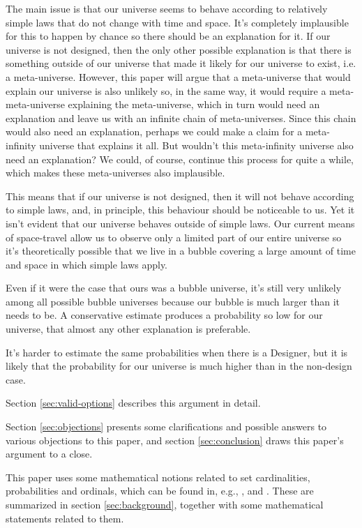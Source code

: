 \documentclass[a4paper
,draft
]{article}
\newcommand{\paper}[1]{paper}
\begin{document}
The main issue is that our universe seems to behave according to relatively
simple laws that do not change with time and space.
It’s completely implausible for this to happen by chance so there should be
an explanation for it.
If our universe is not designed, then the only other possible explanation is that
there is something outside of our universe that made it likely for our universe
to exist, i.e. a meta-universe.
However, this paper will argue that a meta-universe that
would explain our universe is also unlikely so, in the same way,
it would require a meta-meta-universe explaining the meta-universe,
which in turn would need an explanation and leave us with an infinite chain
of meta-universes.
Since this chain would also need an explanation, perhaps we could make a
claim for a meta-infinity universe that explains it all.
But wouldn't this meta-infinity universe also need an explanation?
We could, of course,
continue this process for quite a while,
which makes these meta-universes also implausible.

This means that if our universe is not designed, then it will not behave
according to simple laws, and, in principle, this behaviour should be
noticeable to us.
Yet it isn't evident that our universe behaves outside of simple laws.
Our current means of space-travel allow us to observe only a limited
part of our entire universe so it’s theoretically possible that we live
in a bubble covering
a large amount of time and space in which simple laws apply.

Even if it were the case that ours was a bubble universe,
it’s still very unlikely among all possible bubble universes
because our bubble is much larger than it needs to be.
A conservative estimate produces a probability so low for our universe,
that almost any other explanation is preferable.

It's harder to estimate the same probabilities when there is a Designer, but
it is likely that the probability for our universe is much higher than in the
non-design case.

Section \ref{sec:valid-options} describes this argument in detail.

Section \ref{sec:objections} presents some clarifications and possible
answers to various objections to this paper,
and section \ref{sec:conclusion} draws this \paper{}'s argument to a close.

This \paper{} uses some mathematical notions related to set cardinalities,
probabilities and ordinals, which can be found in, e.g.,
\textcite{sep-set-theory}, \textcite{Cohen1966} and \textcite{Billingsley1995}.
These are summarized in section \ref{sec:background}, together with some
mathematical statements related to them.
\end{document}
